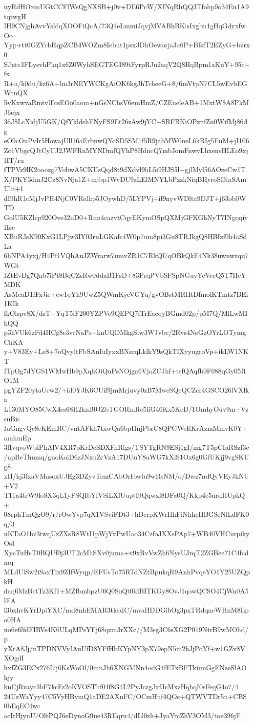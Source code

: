 uyRdHOxmUGtCCFlWsQgNXSB+j0v+DE6PcW/XINqRhQQ3Tfohp9o34Eu1A9tqtwgH
IH9CNjghAvvYsldqXOOFiQcA/73Q1eLmmiJqvjMVABhBKisIxgbu1gHqGdyxfwOo
Yyp+tt0GZYcbRqpZCB4WOZm8Icbut1psx3DhOeworja3a6P+BfsfT2EZyG+bzrx0
SJntc3FLysvhPkq1x6Z0WyhSEGTEGI89tFyrpRJu2aqV2Q8HqBpm1aKuY+95c+fx
R+a/k0du/kz6A+lm3rNEYWCKgAiOK6kgJhTcheeG+8/6mVtpN7CL5wEvbEGWtnQX
5vKxwvaRmtvlFcsEOo0aom+nGsNCbsV6emHmZ/CZEneleAB+1MxtW8A8PkMJ6ejx
36J8LcXidjU5GK/QfYkldshENyFS9Et26zAw9jYC+SRFBKiOPznfZn0WifMj86dg
eO9cOuPvIr5HowajUll16aErbnwQYoSD5SM1f5R9jabMW0neL6kRIg5EuM+jI106
Zc1VbgcQJtCyUJ2JWFRnMYNDmfQVhP8HdncQ7mbJomFnwyLhxensHLEo9xjHT/ru
fTPVz9lK2ooozg7VobwA5CKUsQqd8t9dXdvl9hL5i9HJS5l+gjlMyl56AOzeCw1T
X/PKY3dmJ2Cz8NvNja1Z+mjbp1WvDU9zLElMNYLbPzzkNiqBHyroSDinSAmUln+1
dI9hR1cMjJvPH4NjC0VRelhp5JOywhD/5LYPVj+if9nyvWDlta9DJT+j63ob0WTD
GolU5KZlcp920Ove32uD0+Rnn4cazvtCqyEKymOSpQXMjGFKGhNyT7INgqqiyHsc
XBuRJsK90KxG1LPjw3IY03ruLGKafc4W0p7um8pi3Gu8TRJkgQ8HBIzf0h4aSdLa
6hNPA4yxj/H4Pf1VQhAuJZWrarw7umvZR1C7RkQl7qOBkQkE4Nk38uwnwzqu7WGt
IZtEvDg7Qnb7iPt8BqCZsRw0ddaB1FsD+83PrqPVbSFSpNGuvYcVecQ5T7HeYMDK
AsMeaD1fFzJie+cw1qYh9UwZ5QWmKyeVGYu/gvOBstMRHtDfmolKTmtz7BEi1KIk
fkOlspv8X/dzT+YqT5iF200YZPVe9QEPQ7fTrEacqyBGmd02p/pM7Q/MlLwMIkQQ
p3hVUk6zFd4HCg8e3vcNaPs+knUQDMkgSfw3WJvbc/2Rvs4NeGzOYrLOTymgChKA
y+V83Ey+Le8+7oQvyltFbSAnIuIyxxBNzrqLklkY9sQkTIXyyugroVp+ikLW1NKT
ITpOg7dYGS1WMwHb9pXqhOiQuPsNOjga6VjaZCJhf+tsfQAqfb0F088qGy05RO1M
pgYZF20ytaUcw2/+id0YJK6CUif9jmMrjuvy0zB7MweSQcQCZcr4GSCO26lVXlka
L130MYO85CwX4es68H2knB0JZbTGORmRe5liG46Kx5KeD/1OmhyOuv9m+VzsuBic
IuGngvQe8eKEmRC/vntAFkh7txwQa6bpHnjPbrC8QPGWsEKrAzmMmvK0Y+amhmEp
3fIvqvoWbfPhAlV4XR7oKrDeSDXFnRfgs/TSYTgRN9ESj1gI/mg7T5pCIaRSzf3c
/npBeThumq/guoKoiD6zJNxuZrVzA17DUuY8uWG7kXiS1Ox6g0GfUKjj9vgSKUg8
xH/hj3fxaVMasoxUJEg3DZyvTcmCAbOrIbwlu9wRsNM/o/Dwz7ndQyVEyJkNU+V2
T11a4trW9loSX3qL1yFSQIbYfVSiLXfUuptI9Qqwxl8DFa0Q/Kkp4e5urdHUpkQ+
08rphTmQgO9/r/rOwYvp7qX1VSviFDt3+hBcrpKWrHhFiNhheHBGSeNlLdFK0q/3
uKTaO1bz3twqUzZXsR8WtI1pWjYxPwUao34CzfoJXXsPAp7+WB40VHCurpikyOsI
XycTuHsT0BQUf0j3UT2cMhSXv0juma+v9xRvVwZh6NysUJrqT2ZGBee71C4fcdmq
MLdUlSw2iSaxTix9ZIfWyqp/EFUsTo75RTdNZtBpukqR9AnhPvqeYO1Y25UZQpkH
daq6MzBctTz3Kf1+MZfbmbpzU6Q0SoQt0ldBITKGy8OvJ1qowQCSO4CjWn0A5lEA
l3bxhvKYrDpiYXC/md8nhEMAR3tleaIC/mvaHDDGibOg3pxTRdqneWHnM8Lpo0HA
uo6e6lfdFIRVs4K6ULqMPsYFj68qzm3rXXc//M3sg3C6sXG2P019NtrB9wMOhd/p
yXrA8Jj/nTPDNVVyIAuUfD8YFfHbKYpNY3pX79epN5m2hJjPoYf+w1GZv8VXOgdI
hxfZG3ECx276I7j6KsWoOl/0mnJh6XNGMNn4odG4fETxBFTkiunGgENzeSlAOhjy
knCjRvayc3bF7kcFz2oKVOSThf04f8G4L2PyJczgJxfJcMxzHqhqI0sFeqG4o7/4
24UzWaYyy47C5VyHBymQ1aDE2AXnFC/OCmHuf4QOc+QTWVTDr5u+CBS0bEqEC4wc
acIrHjynU7OltPQJ6eDynoG9ue43REqru4/dLl0zh+JyaYrcZhV3OM3/toe396jF
